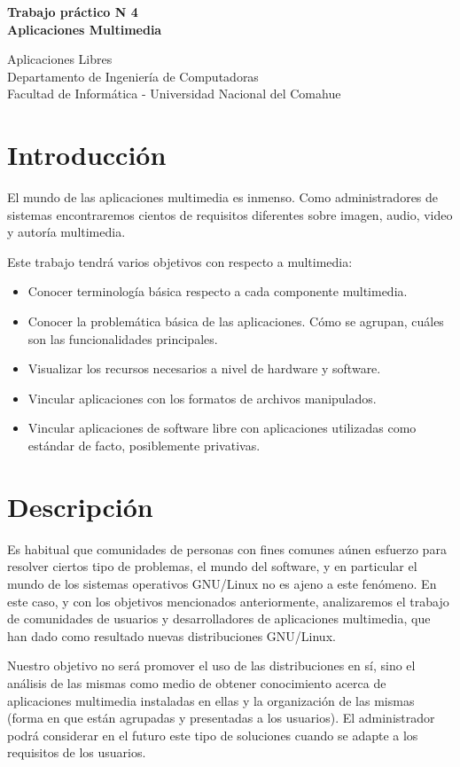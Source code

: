 \documentclass[12pt]{article}
\def\maketitle{

 \makeatletter
 {\color{bl} \centering \huge \sc \textbf{
Trabajo práctico N 4 \\
\large \vspace*{-8pt} \color{black} Aplicaciones Multimedia 
 \vspace*{8pt} }\par}
 \makeatother


 \makeatletter
 {\centering \small 
	Aplicaciones Libres\\
 	Departamento de Ingeniería de Computadoras \\
 	Facultad de Informática - Universidad Nacional del Comahue \\
 	\vspace{20pt} }
 \makeatother

}
\begin{document}
\thispagestyle{empty}
\maketitle
\setlength{\parindent}{0pt}


\section*{Introducción}
El mundo de las aplicaciones multimedia es inmenso. Como administradores de 
sistemas encontraremos cientos de requisitos diferentes sobre imagen, audio, 
video y autoría multimedia. 

Este trabajo tendrá varios objetivos con respecto a multimedia:
\begin{itemize} 
\item Conocer terminología básica respecto a cada componente multimedia. 
\item Conocer la problemática básica de las aplicaciones. Cómo se agrupan, cuáles
son las funcionalidades principales. 
\item Visualizar los recursos necesarios a nivel de hardware y software.
\item Vincular aplicaciones con los formatos de archivos manipulados. 
\item Vincular aplicaciones de software libre con aplicaciones utilizadas 
como estándar de facto, posiblemente privativas. 
\end{itemize}

\section*{Descripción}
Es habitual que comunidades de personas con fines comunes aúnen esfuerzo para 
resolver ciertos tipo de problemas, el mundo del software, y en particular el 
mundo de los sistemas operativos GNU/Linux no es ajeno a este fenómeno. En 
este caso, y con los objetivos mencionados anteriormente, analizaremos el 
trabajo de comunidades de usuarios y desarrolladores de aplicaciones 
multimedia, que han dado como resultado nuevas distribuciones GNU/Linux.  

Nuestro objetivo no será promover el uso de las distribuciones en sí, sino el 
análisis de las mismas como medio de obtener conocimiento acerca de 
aplicaciones multimedia instaladas en ellas y la organización de las 
mismas (forma en que están agrupadas y presentadas a los usuarios). El 
administrador podrá considerar en el futuro este tipo de soluciones cuando 
se adapte a los requisitos de los usuarios.  
\end{document}

